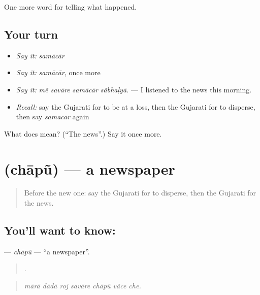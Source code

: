 \begin{grammarlens}[title={What you've built}]
One more word for telling what happened.
\end{grammarlens}

\subsection*{Your turn}
\begin{itemize}
\raggedright
  \item \emph{Say it:} \emph{samācār}
  \item \emph{Say it:} \emph{samācār}, once more
  \item \emph{Say it:} \emph{mẽ savāre samācār sā̃bhaḷyā.} — I listened to the news this morning.
  \item \emph{Recall:} say the Gujarati for to be at a loss, then the Gujarati for to disperse, then say \emph{samācār} again
\end{itemize}

\begin{tcolorbox}[breakable,colback=teal!4,colframe=teal!35!black,title={Before you move on}]
What does  mean? (\textquotedblleft{}The news\textquotedblright{}.) Say it once more.
\end{tcolorbox}
\section[\texorpdfstring{\gu{છાપું} (chāpũ)}{છાપું (chāpũ)}]{ (chāpũ) — a newspaper}

\label{lesson:GU-C311-chapu}



\begin{quote}
Before the new one: say the Gujarati for to disperse, then the Gujarati for the news.
\end{quote}

\subsection*{You'll want to know: }
\textbf{} — \emph{chāpũ} — \textquotedblleft{}a newspaper\textquotedblright{}.

\begin{quote}
      .
\end{quote}

\begin{quote}
\emph{mārā dādā roj savāre chāpũ vā̃ce che.}
\end{quote}

